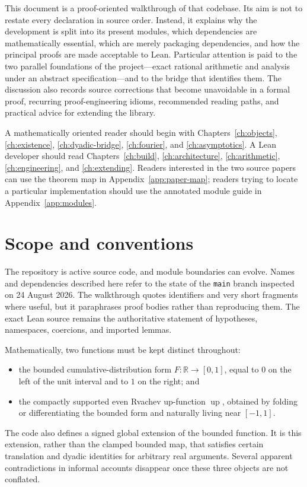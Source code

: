 \documentclass[11pt,oneside]{report}
\theoremstyle{definition}
\theoremstyle{remark}
\DeclareRobustCommand{\lean}[1]{\texorpdfstring{\texttt{\expandafter\seqsplit\expandafter{\detokenize{#1}}}}{\detokenize{#1}}}
\newcommand{\upf}{\operatorname{up}}
\newcommand{\R}{\mathbb{R}}
\begin{document}
This document is a proof-oriented walkthrough of that codebase.  Its aim is not to restate every declaration in source order.  Instead, it explains why the development is split into its present modules, which dependencies are mathematically essential, which are merely packaging dependencies, and how the principal proofs are made acceptable to Lean.  Particular attention is paid to the two parallel foundations of the project---exact rational arithmetic and analysis under an abstract \lean{IsFabius} specification---and to the bridge that identifies them.  The discussion also records source corrections that become unavoidable in a formal proof, recurring proof-engineering idioms, recommended reading paths, and practical advice for extending the library.

\begin{roadmap}
A mathematically oriented reader should begin with Chapters~\ref{ch:objects}, \ref{ch:existence}, \ref{ch:dyadic-bridge}, \ref{ch:fourier}, and \ref{ch:asymptotics}.  A Lean developer should read Chapters~\ref{ch:build}, \ref{ch:architecture}, \ref{ch:arithmetic}, \ref{ch:engineering}, and \ref{ch:extending}.  Readers interested in the two source papers can use the theorem map in Appendix~\ref{app:paper-map}; readers trying to locate a particular implementation should use the annotated module guide in Appendix~\ref{app:modules}.
\end{roadmap}

\chapter*{Scope and conventions}
The repository is active source code, and module boundaries can evolve.  Names and dependencies described here refer to the state of the \texttt{main} branch inspected on 24 August 2026.  The walkthrough quotes identifiers and very short fragments where useful, but it paraphrases proof bodies rather than reproducing them.  The exact Lean source remains the authoritative statement of hypotheses, namespaces, coercions, and imported lemmas.

Mathematically, two functions must be kept distinct throughout:
\begin{itemize}
  \item the bounded cumulative-distribution form \(F\colon\R\to[0,1]\), equal to \(0\) on the left of the unit interval and to \(1\) on the right; and
  \item the compactly supported even Rvachev up-function \(\upf\), obtained by folding or differentiating the bounded form and naturally living near \([-1,1]\).
\end{itemize}
The code also defines a signed global extension of the bounded function.  It is this extension, rather than the clamped bounded map, that satisfies certain translation and dyadic identities for arbitrary real arguments.  Several apparent contradictions in informal accounts disappear once these three objects are not conflated.
\end{document}
